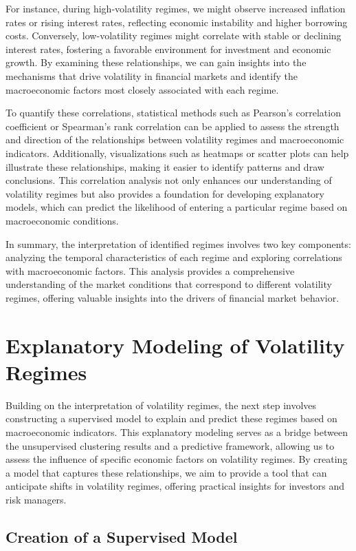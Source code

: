 For instance, during high-volatility regimes, we might observe increased inflation rates or rising interest rates, reflecting economic instability and higher borrowing costs. Conversely, low-volatility regimes might correlate with stable or declining interest rates, fostering a favorable environment for investment and economic growth. By examining these relationships, we can gain insights into the mechanisms that drive volatility in financial markets and identify the macroeconomic factors most closely associated with each regime.

To quantify these correlations, statistical methods such as Pearson’s correlation coefficient or Spearman’s rank correlation can be applied to assess the strength and direction of the relationships between volatility regimes and macroeconomic indicators. Additionally, visualizations such as heatmaps or scatter plots can help illustrate these relationships, making it easier to identify patterns and draw conclusions. This correlation analysis not only enhances our understanding of volatility regimes but also provides a foundation for developing explanatory models, which can predict the likelihood of entering a particular regime based on macroeconomic conditions.

In summary, the interpretation of identified regimes involves two key components: analyzing the temporal characteristics of each regime and exploring correlations with macroeconomic factors. This analysis provides a comprehensive understanding of the market conditions that correspond to different volatility regimes, offering valuable insights into the drivers of financial market behavior.

\section{Explanatory Modeling of Volatility Regimes}

Building on the interpretation of volatility regimes, the next step involves constructing a supervised model to explain and predict these regimes based on macroeconomic indicators. This explanatory modeling serves as a bridge between the unsupervised clustering results and a predictive framework, allowing us to assess the influence of specific economic factors on volatility regimes. By creating a model that captures these relationships, we aim to provide a tool that can anticipate shifts in volatility regimes, offering practical insights for investors and risk managers.

\subsection{Creation of a Supervised Model}

